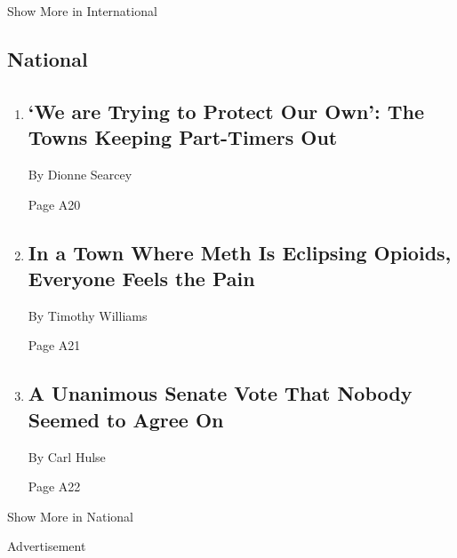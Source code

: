 Show More in International

\hypertarget{national}{%
\subsection{National}\label{national}}

\begin{enumerate}
\def\labelenumi{\arabic{enumi}.}
\item
  \href{/2020/03/28/us/politics/coronavirus-second-homes.html}{}

  \hypertarget{we-are-trying-to-protect-our-own-the-towns-keeping-part-timers-out-1}{%
  \subsection{`We are Trying to Protect Our Own': The Towns Keeping
  Part-Timers
  Out}\label{we-are-trying-to-protect-our-own-the-towns-keeping-part-timers-out-1}}

  By Dionne Searcey

  Page A20
\item
  \href{/2020/03/28/us/methamphetamine-kentucky-effects.html}{}

  \hypertarget{in-a-town-where-meth-is-eclipsing-opioids-everyone-feels-the-pain-1}{%
  \subsection{In a Town Where Meth Is Eclipsing Opioids, Everyone Feels
  the
  Pain}\label{in-a-town-where-meth-is-eclipsing-opioids-everyone-feels-the-pain-1}}

  By Timothy Williams

  Page A21
\item
  \href{/2020/03/28/us/senate-coronavirus-stimulus-bill.html}{}

  \hypertarget{a-unanimous-senate-vote-that-nobody-seemed-to-agree-on}{%
  \subsection{A Unanimous Senate Vote That Nobody Seemed to Agree
  On}\label{a-unanimous-senate-vote-that-nobody-seemed-to-agree-on}}

  By Carl Hulse

  Page A22
\end{enumerate}

Show More in National

Advertisement


